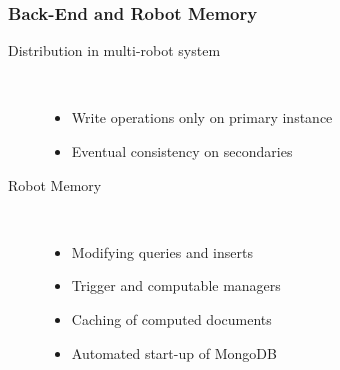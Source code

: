 \begin{frame}
  \frametitle{Back-End and Robot Memory}
  \begin{description}
  \item[Distribution in multi-robot system]
                \hfill \\
    \begin{itemize}
    \item Write operations only on primary instance
    \item Eventual consistency on secondaries %
    \end{itemize}
\bigskip
  \item[Robot Memory]
                \hfill \\
    \begin{itemize}
    \item Modifying queries and inserts
    \item Trigger and computable managers
    \item Caching of computed documents
    \item Automated start-up of MongoDB
    \end{itemize}
  \end{description}
\end{frame}


